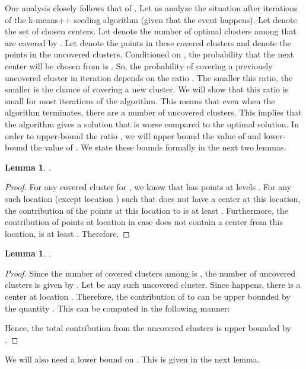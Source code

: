 \documentclass[11pt]{article}
\newtheorem{lemma}[theorem]{Lemma}
\begin{document}
Our analysis closely follows that of \cite{br12}. 
Let us analyze the situation after  iterations of the k-means++ seeding algorithm (given that the event  happens).
Let  denote the set of chosen centers.
Let  denote the number of optimal clusters among  that are covered by .
Let  denote the points in these covered clusters and  denote the points in the uncovered clusters.
Conditioned on , the probability that the next center will be chosen from  is .
So, the probability of covering a previously uncovered cluster in iteration  depends on the ratio .
The smaller this ratio, the smaller is the chance of covering a new cluster.
We will show that this ratio is small for most iterations of the algorithm.
This means that even when the algorithm terminates, there are a number of uncovered clusters. 
This implies that the algorithm gives a solution that is worse compared to the optimal solution.
In order to upper-bound the ratio , we will upper bound the value of  and lower-bound the value of .
We state these bounds formally in the next two lemmas.


\begin{lemma}\label{lemma:11}
.
\end{lemma}

\begin{proof}
For any covered cluster  for , we know that  has points at levels .
For any such location  (except location ) such that  does not have a center at this location, the contribution of the points at this location to  is at least . 
Furthermore, the contribution of points at location  in case  does not contain a center from this location, is at least .
Therefore,

\end{proof}


\begin{lemma}\label{lemma:12}
.
\end{lemma}

\begin{proof}
Since the number of covered clusters among  is , the number of uncovered clusters is given by .
Let  be any such uncovered cluster.
Since  happens, there is a center at location .
Therefore, the contribution of  to  can be upper bounded by the quantity . 
This can be computed in the following manner:

Hence, the total contribution from the uncovered clusters  is upper bounded by 
.
\end{proof}

We will also need a lower bound on . This is given in the next lemma.
\end{document}
